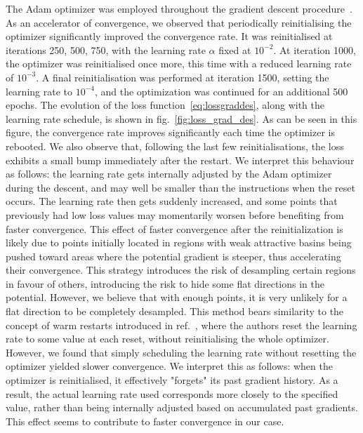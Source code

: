 \documentclass[11pt,a4paper]{article}
\begin{document}
	The Adam optimizer was employed throughout the gradient descent procedure~\cite{kingma2017adammethodstochasticoptimization}. As an accelerator of convergence, we observed that periodically reinitialising the optimizer significantly improved the convergence rate. It was reinitialised at iterations {250, 500, 750}, with the learning rate $\alpha$ fixed at $10^{-2}$. At iteration 1000, the optimizer was reinitialised once more, this time with a reduced learning rate of $10^{-3}$. A final reinitialisation was performed at iteration 1500, setting the learning rate to $10^{-4}$, and the optimization was continued for an additional 500 epochs. The evolution of the loss function~\eqref{eq:lossgraddes}, along with the learning rate schedule, is shown in fig.~\ref{fig:loss_grad_des}. As can be seen in this figure, the convergence rate improves significantly each time the optimizer is rebooted. We also observe that, following the last few reinitialisations, the loss exhibits a small bump immediately after the restart. We interpret this behaviour as follows: the learning rate gets internally adjusted by the Adam optimizer during the descent, and may well be smaller than the instructions when the reset occurs. The learning rate then gets suddenly increased, and some points that previously had low loss values may momentarily worsen before benefiting from faster convergence. This effect of faster convergence after the reinitialization is likely due to points initially located in regions with weak attractive basins being pushed toward areas where the potential gradient is steeper, thus accelerating their convergence. This strategy introduces the risk of desampling certain regions in favour of others, introducing the risk to hide some flat directions in the potential. However, we believe that with enough points, it is very unlikely for a flat direction to be completely desampled. This method bears similarity to the concept of warm restarts introduced in ref.~\cite{loshchilov2017sgdrstochasticgradientdescent}, where the authors reset the learning rate to some value at each reset, without reinitialising the whole optimizer. However, we found that simply scheduling the learning rate without resetting the optimizer yielded slower convergence. We interpret this as follows: when the optimizer is reinitialised, it effectively "forgets" its past gradient history. As a result, the actual learning rate used corresponds more closely to the specified value, rather than being internally adjusted based on accumulated past gradients. This effect seems to contribute to faster convergence in our case.
	
\end{document}
